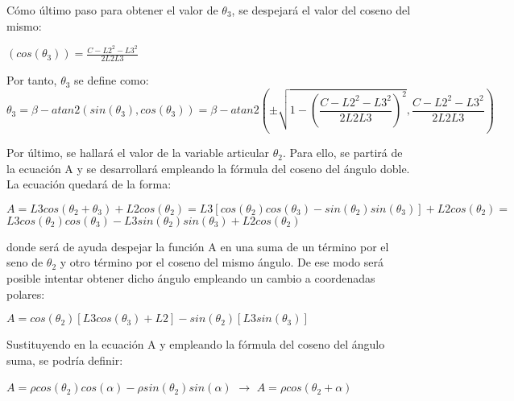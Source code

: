 	Cómo último paso para obtener el valor de $\theta_{3}$, se despejará el valor del coseno del mismo:\\
	\begin{center}
		$ (cos(\theta_{3})) = \frac{C-L2^{2}-L3^{2}}{2L2L3} $
	\end{center}
	Por tanto, $\theta_{3}$ se define como:\\
	\begin{equation}
	\theta_{3}=\beta -atan2(sin(\theta_{3}),cos(\theta_{3}))=\beta-atan2(\pm \sqrt{1-(\frac{C-L2^{2}-L3^{2}}{2L2L3})^{2}},\frac{C-L2^{2}-L3^{2}}{2L2L3} )
	\end{equation}
	
	\newpage
	Por último, se hallará el valor de la variable articular $\theta_{2}$. Para ello, se partirá de la ecuación A y se desarrollará empleando la fórmula del coseno del ángulo doble. La ecuación quedará de la forma: \\
	\begin{center}
		$A=L3cos(\theta_{2}+\theta_{3})+L2cos(\theta_{2})=L3[cos(\theta_{2})cos(\theta_{3})-sin(\theta_{2})sin(\theta_{3})]+L2cos(\theta_{2})=$\\ \vspace{0.3cm} $L3cos(\theta_{2})cos(\theta_{3})-L3sin(\theta_{2})sin(\theta_{3})+L2cos(\theta_{2})$
	\end{center}
donde será de ayuda despejar la función A en una suma de un término por el seno de $ \theta_{2}$ y otro término por el coseno del mismo ángulo. De ese modo será posible intentar obtener dicho ángulo empleando un cambio a coordenadas polares:
	\begin{center}
		$A=cos(\theta_{2})[L3cos(\theta_{3})+L2]-sin(\theta_{2})[L3sin(\theta_{3})]$\\
		\vspace{0.3cm}
		\hfill
	\end{center}
	Sustituyendo en la ecuación A y empleando la fórmula del coseno del ángulo suma, se podría definir:\\
	\begin{center}
	$A=\rho cos(\theta_{2})cos(\alpha)-\rho sin(\theta_{2})sin(\alpha)$ $\rightarrow$ $A=\rho cos(\theta_{2}+\alpha)$
	\end{center}
	

